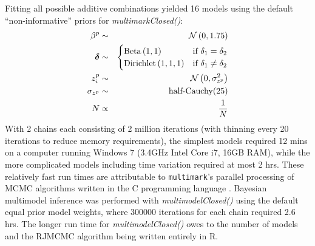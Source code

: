 \documentclass[12pt]{article}
\begin{document}
Fitting all possible additive combinations yielded 16 models using the default ``non-informative'' priors for \textit{multimarkClosed()}:
\begin{eqnarray*}
  \beta^p & \sim & {\cal N} \left( 0, 1.75 \right) \\
  \boldsymbol{\delta} & \sim & \begin{cases}
                                  \text{Beta} \left( 1, 1 \right) & \text{if } \delta_1 = \delta_2 \\
                                  \text{Dirichlet} \left( 1, 1, 1 \right) & \text{if } \delta_1 \ne \delta_2
                               \end{cases} \\
  z^p_i & \sim & {\cal N} \left( 0, \sigma^2_{z^p} \right) \\
  \sigma_{z^p} & \sim & \text{half-Cauchy}(25)\\
  N & \propto & \frac{1}{N}
\end{eqnarray*}
With 2 chains each consisting of 2 million iterations (with thinning every 20 iterations to reduce memory requirements), the simplest models required 12 mins on a computer running Windows 7 (3.4GHz Intel Core i7, 16GB RAM), while the more complicated models including time variation required at most 2 hrs. These relatively fast run times are attributable to \verb|multimark|'s parallel processing of MCMC algorithms written in the C programming language \citep{KernighanRitchie1988}. Bayesian multimodel inference was performed with \textit{multimodelClosed()} using the default equal prior model weights, where 300000 iterations for each chain required 2.6 hrs. The longer run time for \textit{multimodelClosed()} owes to the number of models and the RJMCMC algorithm being written entirely in R.
\end{document}

